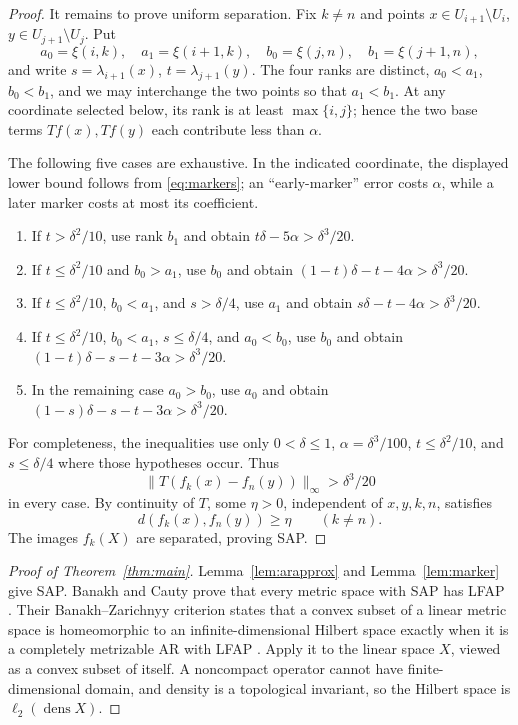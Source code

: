\documentclass[11pt]{article}
\newcommand{\dens}{\operatorname{dens}}
\begin{document}
\begin{proof}
It remains to prove uniform separation.  Fix $k\ne n$ and points
$x\in U_{i+1}\setminus U_i$, $y\in U_{j+1}\setminus U_j$.  Put
\[
 a_0=\xi(i,k),\quad a_1=\xi(i+1,k),\quad
 b_0=\xi(j,n),\quad b_1=\xi(j+1,n),
\]
and write $s=\lambda_{i+1}(x)$, $t=\lambda_{j+1}(y)$.  The four ranks are
distinct, $a_0<a_1$, $b_0<b_1$, and we may interchange the two points so
that $a_1<b_1$.  At any coordinate selected below, its rank is at least
$\max\{i,j\}$; hence the two base terms $Tf(x),Tf(y)$ each contribute less
than $\alpha$.

The following five cases are exhaustive.  In the indicated coordinate, the
displayed lower bound follows from \eqref{eq:markers}; an ``early-marker''
error costs $\alpha$, while a later marker costs at most its coefficient.
\begin{enumerate}
\item If $t>\delta^2/10$, use rank $b_1$ and obtain
$t\delta-5\alpha>\delta^3/20$.
\item If $t\le\delta^2/10$ and $b_0>a_1$, use $b_0$ and obtain
$(1-t)\delta-t-4\alpha>\delta^3/20$.
\item If $t\le\delta^2/10$, $b_0<a_1$, and $s>\delta/4$, use $a_1$ and
obtain $s\delta-t-4\alpha>\delta^3/20$.
\item If $t\le\delta^2/10$, $b_0<a_1$, $s\le\delta/4$, and $a_0<b_0$,
use $b_0$ and obtain $(1-t)\delta-s-t-3\alpha>\delta^3/20$.
\item In the remaining case $a_0>b_0$, use $a_0$ and obtain
$(1-s)\delta-s-t-3\alpha>\delta^3/20$.
\end{enumerate}
For completeness, the inequalities use only $0<\delta\le1$,
$\alpha=\delta^3/100$, $t\le\delta^2/10$, and $s\le\delta/4$ where those
hypotheses occur.  Thus
\[
              \|T(f_k(x)-f_n(y))\|_\infty>\delta^3/20
\]
in every case.  By continuity of $T$, some $\eta>0$, independent of
$x,y,k,n$, satisfies
\[
              d(f_k(x),f_n(y))\ge\eta\qquad(k\ne n).
\]
The images $f_k(X)$ are separated, proving SAP.
\end{proof}

\begin{proof}[Proof of Theorem~\ref{thm:main}]
Lemma~\ref{lem:arapprox} and Lemma~\ref{lem:marker} give SAP.  Banakh and
Cauty prove that every metric space with SAP has LFAP
\cite[Lemma~1]{BanakhCauty}.  Their Banakh--Zarichnyy criterion states that a
convex subset of a linear metric space is homeomorphic to an
infinite-dimensional Hilbert space exactly when it is a completely
metrizable AR with LFAP \cite[Theorem~4]{BanakhCauty}.  Apply it to the
linear space $X$, viewed as a convex subset of itself.  A noncompact operator
cannot have finite-dimensional domain, and density is a topological
invariant, so the Hilbert space is $\ell_2(\dens X)$.
\end{proof}
\end{document}
